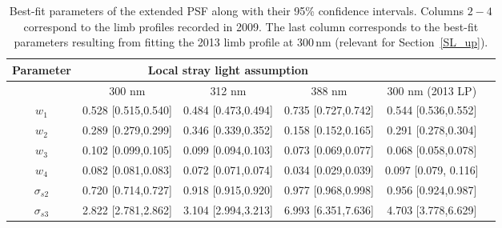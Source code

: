 \documentclass[goettingen, gauss, print]{thesis}
\begin{document}
\begin{table}


\centering
 \begin{adjustwidth}{-1cm}{}

\caption{Best-fit parameters of the extended PSF along with their 95\% confidence intervals. Columns $2-4$ correspond to the limb profiles recorded in 2009. The last column corresponds to the best-fit parameters resulting from fitting the 2013 limb profile at 300\,nm (relevant for Section~\ref{SL_up}). }
\label{tab:psfpar_me}
\centering
\begin{tabular}{cccccc}

\hline
\hline
Parameter  & \multicolumn{3}{c}{Local stray light assumption} \\
\hline
  & 300 nm & 312 nm & 388 nm & 300 nm (2013 LP)\\
\hline
 $w_1$ &0.528 [0.515,0.540]&0.484 [0.473,0.494]&0.735 [0.727,0.742]& 0.544 [0.536,0.552] \\
 $w_2$&0.289 [0.279,0.299]&0.346 [0.339,0.352]& 0.158 [0.152,0.165]& 0.291 [0.278,0.304]\\
 $w_3$&0.102  [0.099,0.105]&0.099  [0.094,0.103]&0.073 [0.069,0.077]&0.068 [0.058,0.078]\\
 $w_4$&0.082  [0.081,0.083]&0.072  [0.071,0.074]& 0.034 [0.029,0.039]& 0.097 [0.079, 0.116]\\
$\sigma_{s2}$&0.720  [0.714,0.727]&0.918  [0.915,0.920]& 0.977 [0.968,0.998] & 0.956 [0.924,0.987]\\
$\sigma_{s3}$&2.822  [2.781,2.862]&3.104  [2.994,3.213]&6.993  [6.351,7.636] & 4.703 [3.778,6.629]\\
\hline
\end{tabular}

 \end{adjustwidth}

\end{table}
\end{document}
